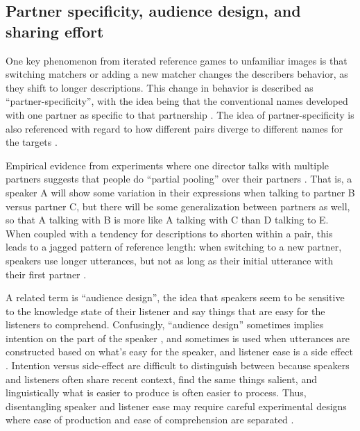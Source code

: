 \documentclass[]{article}
\begin{document}
\subsection{Partner specificity, audience design, and sharing effort}


One key phenomenon from iterated reference games to unfamiliar images is that switching matchers or adding a new matcher changes the describers behavior, as they shift to longer descriptions. This change in behavior is described as ``partner-specificity'', with the idea being that the conventional names developed with one partner as specific to that partnership \citep{brennan1996, metzing2003a, hawkins2021a}. The idea of partner-specificity is also referenced with regard to how different pairs diverge to different names for the targets \citep{hawkins2020b}. 

Empirical evidence from experiments where one director talks with multiple partners suggests that people do ``partial pooling'' over their partners \citep{hawkins2021, yoon2014}. That is, a speaker A will show some variation in their expressions when talking to partner B versus partner C, but there will be some generalization between partners as well, so that A talking with B is more like A talking with C than D talking to E. When coupled with a tendency for descriptions to shorten within a pair, this leads to a jagged pattern of reference length: when switching to a new partner, speakers use longer utterances, but not as long as their initial utterance with their first partner \citep{yoon2019a}.  

A related term is ``audience design'', the idea that speakers seem to be sensitive to the knowledge state of their listener and say things that are easy for the listeners to comprehend. Confusingly, ``audience design'' sometimes implies intention on the part of the speaker \citep{horton2002a, horton2005}, and sometimes is used when utterances are constructed based on what's easy for the speaker, and listener ease is a side effect \citep{horton1996, rogers2013, macdonald2013}.
  Intention versus side-effect are difficult to distinguish between because speakers and listeners often share recent context, find the same things salient, and linguistically what is easier to produce is often easier to process. Thus, disentangling speaker and listener ease may require careful experimental designs where ease of production and ease of comprehension are separated \citep{ferreira2004}. 
  
\end{document}
